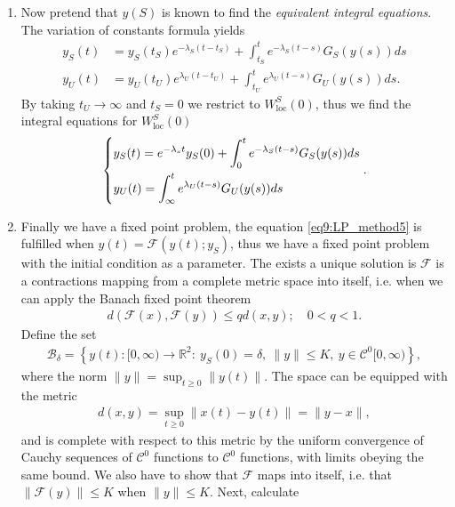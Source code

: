 \begin{enumerate}
\item Now pretend that $y(S)$ is known to find the \emph{equivalent integral equations}. The variation of constants formula yields
	\begin{subequations}
	\begin{align}
		y_{S}(t) &= y_{S}(t_S) e^{- \lambda _{S}(t - t_S)} + \int_{t_S}^{t} e^{-\lambda _{S}(t-s)} G_{S}(y(s)) ds \\
		y_{U}(t) &= y_{U}(t_U) e^{ \lambda _{U}(t - t_U)} + \int_{t_U}^{t} e^{\lambda _{U}(t-s)} G_{U}(y(s)) ds. 
	\end{align}
	\end{subequations}
	By taking $t_{U}\to \infty $ and $t_{S}=0$ we restrict to $W^{S}_{ \textrm{loc} }(0)$, thus we find the integral equations for $W^{S}_{ \textrm{loc} }(0)$
	\begin{align}
		\begin{dcases}
		y_{S}(t) = e^{- \lambda _{s}t}y_{S}(0) + \int_{0}^{t} e^{-\lambda _{S}(t-s)}G_{S}(y(s))ds \\
		y_{U}(t) = \int_{\infty }^{t} e^{\lambda_{U}(t-s)}G_{U}(y(s))ds
		\end{dcases}
		.\label{eq9:LP_method5}		
	\end{align}
\item Finally we have a fixed point problem, the equation \eqref{eq9:LP_method5} is fulfilled when $y(t) = \mathcal{F}(y(t);y_S)$, thus we have a fixed point problem with the initial condition as a parameter. The exists a unique solution is $\mathcal{F}$ is a contractions mapping from a complete metric space into itself, i.e. when we can apply the Banach fixed point theorem
	\begin{align}
		d(\mathcal{F}(x), \mathcal{F}(y)) \leq q d(x,y);\quad 0 < q < 1.
	\end{align}
Define the set
\begin{align}
	\mathcal{B}_{\delta} = \left\{ y(t): [0,\infty ) \to \mathbb{R}^{2}:\ y_{S}(0) = \delta,\ \|y\| \leq K,\ y\in \mathcal{C}^{0}[0, \infty ) \right\},
\end{align}
where the norm $\|y\| = \sup_{t\geq 0}\|y(t)\|$. The space can be equipped with the metric 
\begin{align}
	d(x,y) = \sup_{t\geq 0} \| x(t) - y(t) \| = \| y - x\|,
\end{align}
and is complete with respect to this metric by the uniform convergence of Cauchy sequences of $\mathcal{C}^{0}$ functions to $\mathcal{C}^{0}$ functions, with limits obeying the same bound. We also have to show that $\mathcal{F}$ maps into itself, i.e. that $ \|\mathcal{F}(y) \| \leq K$ when $\|y\| \leq K$. Next, calculate

\end{enumerate}
